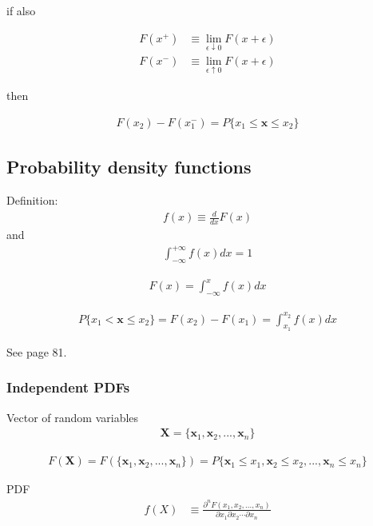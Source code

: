 \documentclass[preprint,authoryear,10pt]{elsarticle}
\begin{document}
if also

\begin{align}
F(x^+) &\equiv \lim_{\epsilon \downarrow 0} F(x + \epsilon) \\
F(x^-) &\equiv \lim_{\epsilon \uparrow 0} F(x + \epsilon)
\end{align}

then

\begin{align}
F(x_2) - F(x_1^-) = P\{x_1 \leq \bm{x} \leq x_2 \}
\end{align}

%
%
\subsection{Probability density functions}

Definition:
\begin{align}
f(x) \equiv \frac{d}{dx}F(x)
\end{align}
and
\begin{align}
\int_{-\infty}^{+\infty} f(x)dx = 1
\end{align}

\begin{align}
F(x) = \int_{-\infty}^{x} f(x)dx
\end{align}

\begin{align}
P\{x_1 < \bm{x} \leq x_2\} = F(x_2) - F(x_1) = \int_{x_1}^{x_2} f(x)dx
\end{align}

See \citet{Papoulis2002Probability} page 81.

%
%
\subsubsection{Independent PDFs}

Vector of random variables
\begin{align}
\bm{X} = \{ \bm{x}_1, \bm{x}_2, ..., \bm{x}_n \}
\end{align}

\begin{align}
F(\bm{X}) = F(\{ \bm{x}_1, \bm{x}_2, ..., \bm{x}_n \}) = P\{\bm{x}_1 \leq x_1, \bm{x}_2 \leq x_2, ..., \bm{x}_n \leq x_n\}
\end{align}

PDF
\begin{align}
f(X) &\equiv \frac{\partial^n F(x_1, x_2, ..., x_n)}{\partial x_1 \partial x_2 \cdots \partial x_n}
\end{align}
\end{document}
